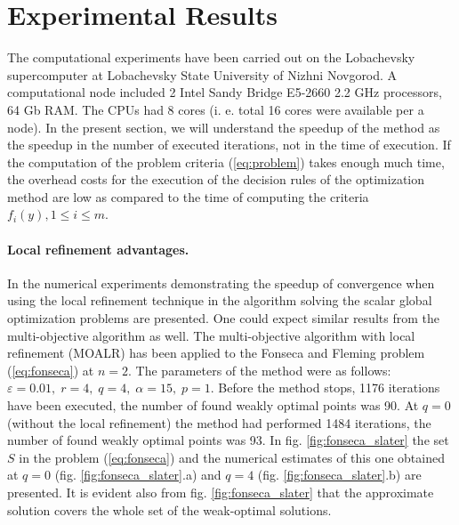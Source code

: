 \documentclass{llncs}
\begin{document}
\section{Experimental Results}
The computational experiments have been carried out on the Lobachevsky supercomputer at
Lobachevsky State University of Nizhni Novgorod. A computational node included 2 Intel
Sandy
Bridge E5-2660 2.2 GHz processors, 64 Gb RAM. The CPUs had 8 cores (i. e. total 16 cores
were available per a node).
In the present section, we will understand the speedup of the method as the speedup in the
number of executed iterations, not in the time of execution. If the computation of the problem
criteria (\ref{eq:problem}) takes enough much time, the overhead costs for the execution of the
decision rules of the optimization method are low as compared to the time of computing the
criteria \(f_i(y), 1\leqslant i\leqslant m\).

\paragraph{Local refinement advantages.} In \cite{barkalovLebedev2016} the numerical
experiments demonstrating the speedup of convergence when using the local refinement
technique in the algorithm solving the scalar global optimization problems are presented. One
could expect similar results from the multi-objective algorithm as well. The multi-objective
algorithm with local refinement (MOALR) has been applied to the  Fonseca and Fleming
problem (\ref{eq:fonseca}) at \(n=2\). The parameters of the method were as follows:
\(\varepsilon=0.01,\;r=4,\;q=4,\;\alpha=15,\;p=1\). Before the method stops, 1176 iterations
have been executed, the number of found weakly optimal points was 90. At \(q=0\) (without the
local refinement) the method had performed 1484 iterations, the number of found weakly
optimal points was 93. In fig. \ref{fig:fonseca_slater} the set \(S\) in the problem
(\ref{eq:fonseca}) and the numerical estimates of this one obtained at \(q=0\) (fig.
\ref{fig:fonseca_slater}.a) and \(q=4\) (fig. \ref{fig:fonseca_slater}.b) are presented. It is
evident also from fig. \ref{fig:fonseca_slater} that the approximate solution covers the whole
set of the weak-optimal solutions.
\end{document}
